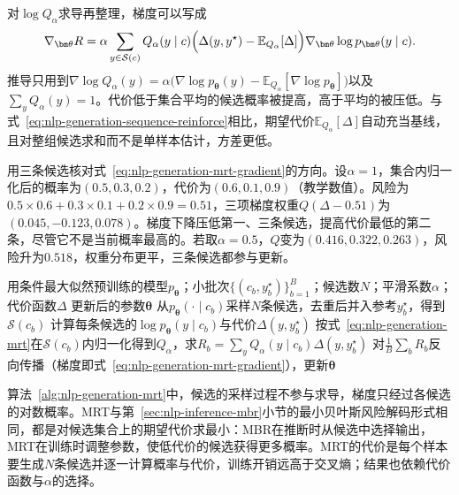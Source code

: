 对$\log Q_\alpha$求导再整理，梯度可以写成
\begin{equation}
  \nabla_{\bm\theta}R=\alpha\sum_{y\in\mathcal S(c)}Q_\alpha(y\mid c)\Bigl(\Delta(y,y^{\star})-\mathbb E_{Q_\alpha}[\Delta]\Bigr)\nabla_{\bm\theta}\log p_{\bm\theta}(y\mid c).
  \label{eq:nlp-generation-mrt-gradient}
\end{equation}
推导只用到$\nabla\log Q_\alpha(y)=\alpha\bigl(\nabla\log p_{\bm\theta}(y)-\mathbb E_{Q_\alpha}[\nabla\log p_{\bm\theta}]\bigr)$以及$\sum_yQ_\alpha(y)=1$。代价低于集合平均的候选概率被提高，高于平均的被压低。与式~\eqref{eq:nlp-generation-sequence-reinforce}相比，期望代价$\mathbb E_{Q_\alpha}[\Delta]$自动充当基线，且对整组候选求和而不是单样本估计，方差更低。

用三条候选核对式~\eqref{eq:nlp-generation-mrt-gradient}的方向。设$\alpha=1$，集合内归一化后的概率为$(0.5,0.3,0.2)$，代价为$(0.6,0.1,0.9)$（教学数值）。风险为$0.5\times0.6+0.3\times0.1+0.2\times0.9=0.51$，三项梯度权重$Q(\Delta-0.51)$为$(0.045,-0.123,0.078)$。梯度下降压低第一、三条候选，提高代价最低的第二条，尽管它不是当前概率最高的。若取$\alpha=0.5$，$Q$变为$(0.416,0.322,0.263)$，风险升为$0.518$，权重分布更平，三条候选都参与更新。

\begin{algorithm}[最小风险训练的一步更新]
  \label{alg:nlp-generation-mrt}
  \begin{algorithmic}[1]
    \Require 用条件最大似然预训练的模型$p_{\bm\theta}$；小批次$\{(c_b,y^{\star}_b)\}_{b=1}^{B}$；候选数$N$；平滑系数$\alpha$；代价函数$\Delta$
    \Ensure 更新后的参数$\bm\theta$
      \State 从$p_{\bm\theta}(\cdot\mid c_b)$采样$N$条候选，去重后并入参考$y^{\star}_b$，得到$\mathcal S(c_b)$
      \State 计算每条候选的$\log p_{\bm\theta}(y\mid c_b)$与代价$\Delta(y,y^{\star}_b)$
      \State 按式~\eqref{eq:nlp-generation-mrt}在$\mathcal S(c_b)$内归一化得到$Q_\alpha$，求$R_b=\sum_yQ_\alpha(y\mid c_b)\Delta(y,y^{\star}_b)$
    \EndFor
    \State 对$\frac1B\sum_bR_b$反向传播（梯度即式~\eqref{eq:nlp-generation-mrt-gradient}），更新$\bm\theta$
  \end{algorithmic}
\end{algorithm}

算法~\ref{alg:nlp-generation-mrt}中，候选的采样过程不参与求导，梯度只经过各候选的对数概率。MRT与第~\ref{sec:nlp-inference-mbr}小节的最小贝叶斯风险解码形式相同，都是对候选集合上的期望代价求最小：MBR在推断时从候选中选择输出，MRT在训练时调整参数，使低代价的候选获得更多概率。MRT的代价是每个样本要生成$N$条候选并逐一计算概率与代价，训练开销远高于交叉熵；结果也依赖代价函数与$\alpha$的选择。

